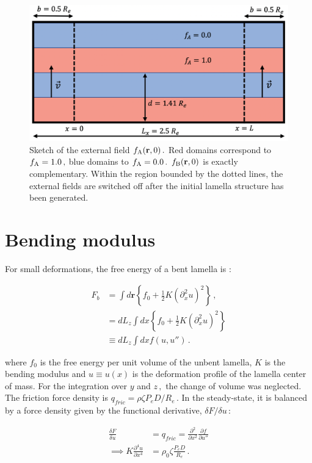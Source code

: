 \documentclass[bachelor,       %
               twoside,        %
               BCOR10mm,       %
               ngerman, english %
               ]{GAUBM}
\begin{document}
\begin{figure}[h]
    \centering
    \includegraphics[width=0.6\linewidth]{figures/fext.png}
    \caption{Sketch of the external field $f_\text A(\mathbf r,0)\,.$ Red domains correspond to $f_\text A=1.0\,,$ blue domains to $f_\text A=0.0\,.$ $f_\text B(\mathbf r,0)$ is exactly complementary. Within the region bounded by the dotted lines, the external fields are switched off after the initial lamella structure has been generated.}
    \label{fig:fext}
\end{figure}


\section{Bending modulus}
For small deformations, the free energy of a bent lamella is \cite{wang94}:

\begin{align}
    F_b&=\int d\mathbf r\left\{f_0+\frac{1}{2}K \left(\partial_x^2 u\right)^2\right\}\,,\\
    &=dL_z\int dx\left\{f_0+\frac{1}{2}K \left(\partial_x^2 u\right)^2\right\}\nonumber\\
    &\equiv dL_z\int dxf(u,u'')\,.
\end{align}

where $f_0$ is the free energy per unit volume of the unbent lamella, $K$ is the bending modulus and $u\equiv u(x)$ is the deformation profile of the lamella center of mass. For the integration over $y$ and $z\,,$ the change of volume was neglected. The friction force density is $q_{fric}=\rho\zeta P_eD/R_e\,.$ In the steady-state, it is balanced by a force density given by the  functional derivative, $\delta F/\delta u\,$:

\begin{align}
    \frac{\delta F}{\delta u}&=q_{fric}=\frac{\partial^2}{\partial x^2}\frac{\partial f}{\partial u''} \nonumber \\
    \implies K\frac{\partial^4u}{\partial x^4}&=\rho_0\zeta\frac{P_eD}{R_e} \,.
\end{align}
\end{document}
